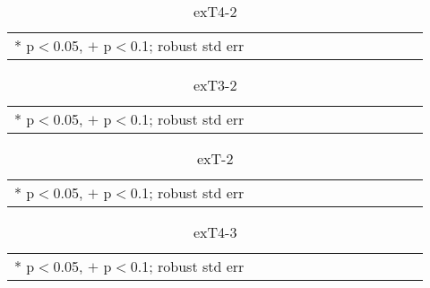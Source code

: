 \documentclass[10pt, letterpaper]{article}
\begin{document}
\begin{spacing}{1.4}
\begin{spacing}{.9} \begin{table}[H]\centering  \label{exT4-2} \begin{scriptsize} \begin{tabular}{p{1.8in}p{.5in}p{.5in}p{.5in}p{.5in}p{.5in}p{.5in}p{.5in}p{.5in}p{.5in}p{.5 in}p{.5in}p{.5 in}}\hline  \hline * p$<$0.05, $+$ p$<$0.1; robust std err \end{tabular}\end{scriptsize}\caption{exT4-2}\end{table} \end{spacing}

\begin{spacing}{.9} \begin{table}[H]\centering  \label{exT3-2} \begin{scriptsize} \begin{tabular}{p{1.8in}p{.5in}p{.5in}p{.5in}p{.5in}p{.5in}p{.5in}p{.5in}p{.5in}p{.5in}p{.5 in}p{.5in}p{.5 in}}\hline  \hline   * p$<$0.05, $+$ p$<$0.1; robust std err \end{tabular}\end{scriptsize}\caption{exT3-2}\end{table} \end{spacing}

\begin{spacing}{.9} \begin{table}[H]\centering  \label{exT-2} \begin{scriptsize} \begin{tabular}{p{1.8in}p{.5in}p{.5in}p{.5in}p{.5in}p{.5in}p{.5in}p{.5in}p{.5in}p{.5in}p{.5 in}p{.5in}p{.5 in}}\hline  \hline   * p$<$0.05, $+$ p$<$0.1; robust std err \end{tabular}\end{scriptsize}\caption{exT-2}\end{table} \end{spacing}


\begin{spacing}{.9} \begin{table}[H]\centering  \label{exT4-3} \begin{scriptsize} \begin{tabular}{p{1.8in}p{.5in}p{.5in}p{.5in}p{.5in}p{.5in}p{.5in}p{.5in}p{.5in}p{.5in}p{.5 in}p{.5in}p{.5 in}}\hline  \hline   * p$<$0.05, $+$ p$<$0.1; robust std err \end{tabular}\end{scriptsize}\caption{exT4-3}\end{table} \end{spacing}


\end{spacing}
\end{document}
